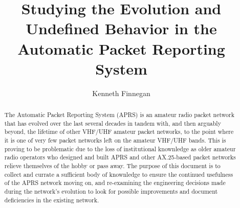 \documentclass{report}
\begin{document}
\title{Studying the Evolution and Undefined Behavior in the Automatic Packet Reporting System}
\author{Kenneth Finnegan}
\maketitle

\begin{abstract}
The Automatic Packet Reporting System (APRS) is an amateur radio packet 
network that has evolved over the last several decades in tandem with, 
and then arguably beyond, the lifetime of other VHF/UHF amateur packet
networks, to the point where it is one of very few packet networks left
on the amateur VHF/UHF bands. This is proving to be problematic due to
the loss of institutional knownledge as older amateur radio operators who
designed and built APRS and other AX.25-based packet networks relieve 
themselves of the hobby or pass away. The purpose of this document is to 
collect and currate a sufficient body of knownledge to ensure the 
continued usefulness of the APRS network moving on, and re-examining 
the engineering decisions made during the network's evolution to look for
possible improvements and document deficiencies in the existing network.
\end{abstract}

\tableofcontents







\end{document}
